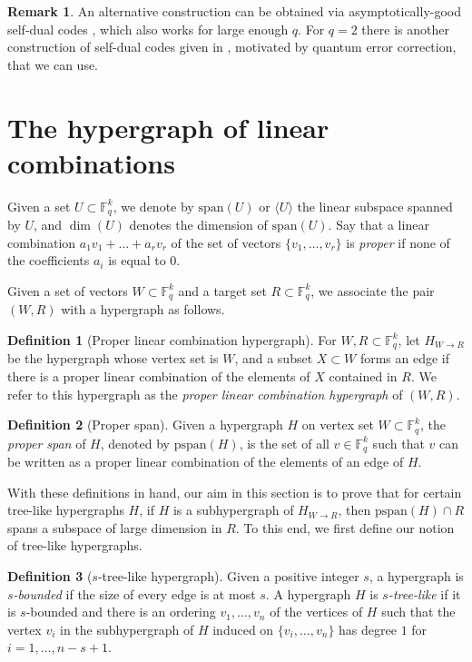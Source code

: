 \documentclass[11pt]{article}
\theoremstyle{plain}
\theoremstyle{definition}
\newtheorem{definition}{Definition}
\newtheorem{rmk}[theorem]{Remark}
\begin{document}
\begin{rmk}
    An alternative construction can be obtained via asymptotically-good self-dual codes \cite[Theorem 1.6]{Stichtenoth06}, which also works for large enough $q$. 
    For $q = 2$ there is another construction of self-dual codes given in \cite{ALT}, motivated by quantum error correction, that we can use. 
\end{rmk}

\section{The hypergraph of linear combinations}\label{sect:trees}

Given a set $U\subset \mathbb{F}_q^k$, we denote by $\mbox{span}(U)$ or $\langle U\rangle$ the linear subspace spanned by $U$, and $\dim(U)$ denotes the dimension of $\mbox{span}(U)$. Say that a linear combination $a_1 v_1+\dots+a_rv_r$ of the set of vectors $\{v_1,\dots,v_r\}$ is \emph{proper} if none of the coefficients $a_i$ is equal to 0.

Given a set of vectors $W\subset \mathbb{F}_q^k$ and a target set $R\subset \mathbb{F}_q^k$, we associate the pair $(W,R)$ with a hypergraph as follows.

\begin{definition}[Proper linear combination hypergraph]
    For $W,R\subset \mathbb{F}_q^k$, let $H_{W\rightarrow R}$ be the hypergraph whose vertex set is $W$, and a subset $X\subset W$ forms an edge if there is a proper linear combination of the elements of $X$  contained in $R$. We refer to this hypergraph as the \emph{proper linear combination hypergraph} of $(W,R)$. 
\end{definition} 

\begin{definition}[Proper span]
    Given a hypergraph $H$ on vertex set $W\subset \mathbb{F}_q^k$, the \emph{proper span} of $H$, denoted by $\mbox{pspan}(H)$, is the set of all $v\in \mathbb{F}_q^k$ such that $v$ can be written as a proper linear combination of the elements of an edge of $H$.
\end{definition}

With these definitions in hand, our aim in this section is to prove that for certain tree-like hypergraphs $H$, if $H$ is a subhypergraph of $H_{W\rightarrow R}$, then $\mbox{pspan}(H)\cap R$ spans a subspace of large dimension in $R$. To this end, we first define our notion of tree-like hypergraphs.


\begin{definition}[$s$-tree-like hypergraph]
    Given a positive integer $s$, a hypergraph is \emph{$s$-bounded} if the size of every edge is  at most $s$. A hypergraph $H$ is \emph{$s$-tree-like} if it is $s$-bounded and there is an ordering $v_1,\dots,v_n$ of the vertices of $H$ such that the vertex $v_i$ in the subhypergraph of $H$ induced on $\{v_i,\dots,v_n\}$ has degree $1$ for $i=1,\dots,n-s+1$.
\end{definition}
\end{document}
